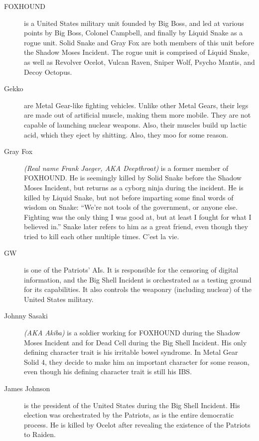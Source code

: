 \documentclass[12pt]{article}
\begin{document}
\begin{description}
	\item [FOXHOUND] is a United States military unit founded by Big Boss,
		and led at various points by Big Boss, Colonel Campbell, and
		finally by Liquid Snake as a rogue unit. Solid Snake and Gray
		Fox are both members of this unit before the Shadow Moses
		Incident. The rogue unit is comprised of Liquid Snake, as well
		as Revolver Ocelot, Vulcan Raven, Sniper Wolf, Psycho Mantis,
		and Decoy Octopus.

	\item [Gekko] are Metal Gear-like fighting vehicles. Unlike other Metal
		Gears, their legs are made out of artificial muscle, making
		them more mobile. They are not capable of launching nuclear
		weapons. Also, their muscles build up lactic acid, which they
		eject by shitting. Also, they moo for some reason.

	\item [Gray Fox] \textit{(Real name Frank Jaeger, AKA Deepthroat)} is a
		former member of FOXHOUND. He is seemingly killed by Solid
		Snake before the Shadow Moses Incident, but returns as a cyborg
		ninja during the incident. He is killed by Liquid Snake, but
		not before imparting some final words of wisdom on Snake:
		``We're not tools of the government, or anyone else. Fighting
		was the only thing I was good at, but at least I fought for
		what I believed in.'' Snake later refers to him as a great
		friend, even though they tried to kill each other multiple
		times. C'est la vie.
		
	\item [GW] is one of the Patriots' AIs. It is responsible for the
		censoring of digital information, and the Big Shell Incident is
		orchestrated as a testing ground for its capabilities. It also
		controls the weaponry (including nuclear) of the United States
		military.

	\item [Johnny Sasaki] \textit{(AKA Akiba)} is a soldier working for
		FOXHOUND during the Shadow Moses Incident and for Dead Cell
		during the Big Shell Incident. His only defining character
		trait is his irritable bowel syndrome. In Metal Gear Solid 4,
		they decide to make him an important character for some reason,
		even though his defining character trait is still his IBS.

	\item [James Johnson] is the president of the United States during the
		Big Shell Incident. His election was orchestrated by the
		Patriots, as is the entire democratic process. He is killed by
		Ocelot after revealing the existence of the Patriots to Raiden.


\end{description}
\end{document}
